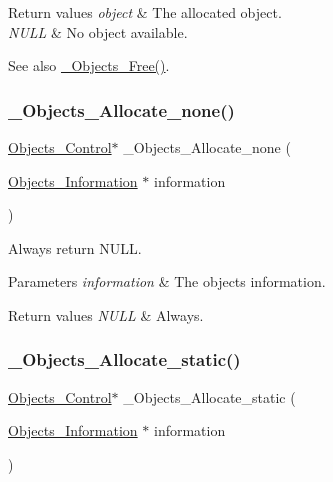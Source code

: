 \begin{DoxyRetVals}{Return values}
{\em object} & The allocated object. \\
\hline
{\em N\+U\+LL} & No object available.\\
\hline
\end{DoxyRetVals}
\begin{DoxySeeAlso}{See also}
\mbox{\hyperlink{group__RTEMSScoreObject_ga2215dcf7e3251e6f629b6a3a96fff44e}{\+\_\+\+Objects\+\_\+\+Free()}}. 
\end{DoxySeeAlso}
\mbox{\label{group__RTEMSScoreObject_gab0861c8e235b2892f2785b6cf582c74e}} 
\subsubsection{\texorpdfstring{\_Objects\_Allocate\_none()}{\_Objects\_Allocate\_none()}}
{\footnotesize\ttfamily \mbox{\hyperlink{structObjects__Control}{Objects\+\_\+\+Control}}$\ast$ \+\_\+\+Objects\+\_\+\+Allocate\+\_\+none (\begin{DoxyParamCaption}\item[{\mbox{\hyperlink{structObjects__Information}{Objects\+\_\+\+Information}} $\ast$}]{information }\end{DoxyParamCaption})}



Always return N\+U\+LL. 


\begin{DoxyParams}{Parameters}
{\em information} & The objects information.\\
\hline
\end{DoxyParams}

\begin{DoxyRetVals}{Return values}
{\em N\+U\+LL} & Always. \\
\hline
\end{DoxyRetVals}
\mbox{\label{group__RTEMSScoreObject_ga93a072e4b17ff04e60d29e57e6901ce1}} 
\subsubsection{\texorpdfstring{\_Objects\_Allocate\_static()}{\_Objects\_Allocate\_static()}}
{\footnotesize\ttfamily \mbox{\hyperlink{structObjects__Control}{Objects\+\_\+\+Control}}$\ast$ \+\_\+\+Objects\+\_\+\+Allocate\+\_\+static (\begin{DoxyParamCaption}\item[{\mbox{\hyperlink{structObjects__Information}{Objects\+\_\+\+Information}} $\ast$}]{information }\end{DoxyParamCaption})}




